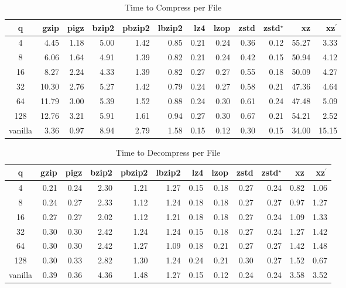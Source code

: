 \begin{table}
\caption{Time to Compress per File}
\centering
\begin{tabular}[]{crrrrrrrrrrr}
\hline
 q        &  gzip & pigz & bzip2 & pbzip2 & lbzip2 & lz4 & lzop & zstd & zstd$^\star$ & xz & xz$^\prime$  \\
\hline
  4       &    4.45 &   1.18 &   5.00 &   1.42 &   0.85 &   0.21 &   0.24 &   0.36 &   0.12 &  55.27 &   3.33  \\
  8       &    6.06 &   1.64 &   4.91 &   1.39 &   0.82 &   0.21 &   0.24 &   0.42 &   0.15 &  50.94 &   4.12  \\
 16      &    8.27 &   2.24 &   4.33 &   1.39 &   0.82 &   0.27 &   0.27 &   0.55 &   0.18 &  50.09 &   4.27  \\
 32      &   10.30 &   2.76 &   5.27 &   1.42 &   0.79 &   0.24 &   0.27 &   0.58 &   0.21 &  47.36 &   4.64  \\
 64      &   11.79 &   3.00 &   5.39 &   1.52 &   0.88 &   0.24 &   0.30 &   0.61 &   0.24 &  47.48 &   5.09  \\
 128     &   12.76 &   3.21 &   5.91 &   1.61 &   0.94 &   0.27 &   0.30 &   0.67 &   0.21 &  54.21 &   2.52  \\
 vanilla  &    3.36 &   0.97 &   8.94 &   2.79 &   1.58 &   0.15 &   0.12 &   0.30 &   0.15 &  34.00 &  15.15  \\
\hline
\end{tabular}
\label{timing_compress}
\end{table}

\begin{table}
\caption{Time to Decompress per File}
\centering
\begin{tabular}[]{crrrrrrrrrrr}
\hline
 q        &  gzip & pigz & bzip2 & pbzip2 & lbzip2 & lz4 & lzop & zstd & zstd$^\star$ & xz & xz$^\prime$  \\
\hline
 4       &    0.21 &   0.24 &   2.30 &   1.21 &   1.27 &   0.15 &   0.18 &   0.27 &   0.24 &   0.82 &   1.06  \\
 8       &    0.24 &   0.27 &   2.33 &   1.12 &   1.24 &   0.18 &   0.18 &   0.27 &   0.27 &   0.97 &   1.27  \\
 16      &    0.27 &   0.27 &   2.02 &   1.12 &   1.21 &   0.18 &   0.18 &   0.27 &   0.24 &   1.09 &   1.33  \\
 32      &    0.30 &   0.30 &   2.42 &   1.24 &   1.24 &   0.15 &   0.18 &   0.27 &   0.24 &   1.27 &   1.42  \\
 64      &    0.30 &   0.30 &   2.42 &   1.27 &   1.09 &   0.18 &   0.21 &   0.27 &   0.27 &   1.42 &   1.48  \\
 128     &    0.30 &   0.33 &   2.82 &   1.30 &   1.24 &   0.24 &   0.21 &   0.30 &   0.27 &   1.52 &   0.67  \\
 vanilla  &    0.39 &   0.36 &   4.36 &   1.48 &   1.27 &   0.15 &   0.12 &   0.24 &   0.24 &   3.58 &   3.52  \\
\hline
\end{tabular}
\label{timing_decompress}
\end{table}



